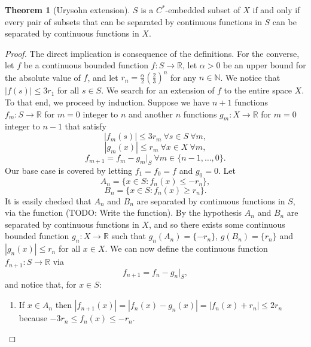 \documentclass[a4paper]{book}
\theoremstyle{definition}
\newtheorem{theorem}{Theorem}[section]
\theoremstyle{ejemplo}
\theoremstyle{demostracion}
\newcommand{\reales}{\mathbb{R}}
\newcommand{\naturales}{\mathbb{N}}
\begin{document}
\begin{theorem}[Urysohn extension]
	$S$ is a $C^*$-embedded subset of $X$ if and only if every pair of subsets that can be separated by continuous functions in $S$ can be separated by continuous functions in $X$.
\end{theorem}
\begin{proof}
	The direct implication is consequence of the definitions. For the converse, let $f$ be a continuous bounded function $f: S \rightarrow \reales$, let $\alpha > 0$ be an upper bound for the absolute value of $f$, and let $r_n = \frac{\alpha}{2} (\frac{2}{3})^n$ for any $n \in \naturales$. We notice that $|f(s)| \leq 3r_1$ for all $s \in S$. We search for an extension of $f$ to the entire space $X$. To that end, we proceed by induction. Suppose we have $n+1$ functions $f_m: S \rightarrow \reales$ for $m = 0$ integer to $n$ and another $n$ functions $g_m: X \rightarrow \reales$ for $m = 0$ integer to $n-1$ that satisfy
	\begin{equation*}
		|f_m(s)| \leq 3r_m\ \forall s \in S\ \forall m,
	\end{equation*}
	\begin{equation*}
		|g_m(x)| \leq r_m\ \forall x \in X\ \forall m,
	\end{equation*}
	\begin{equation*}
		f_{m+1} = f_m - g_m|_S\ \forall m \in \{ n-1, \ldots, 0\}.
	\end{equation*}
	Our base case is covered by letting $f_1 = f_0 = f$ and $g_0 = 0$. Let
	\begin{equation*}
		A_n = \{ x \in S : f_n(x) \leq -r_n\},
	\end{equation*}
	\begin{equation*}
		B_n = \{ x \in S : f_n(x) \geq r_n\}.
	\end{equation*}
	It is easily checked that $A_n$ and $B_n$ are separated by continuous functions in $S$, via the function (TODO: Write the function). By the hypothesis $A_n$ and $B_n$ are separated by continuous functions in $X$, and so there exists some continuous bounded function $g_n: X \rightarrow \reales$ such that $g_n(A_n) = \{ -r_n \}$, $g(B_n) = \{ r_n \}$ and $|g_n(x)| \leq r_n$ for all $x \in X$. We can now define the continuous function $f_{n+1}: S \rightarrow \reales$ via
	\begin{equation}\label{urysohn_ext_fdef}
		f_{n+1} = f_n - g_n|_{S},
	\end{equation}
	and notice that, for $x \in S$:
	\begin{enumerate}
		\item
		If $x \in A_n$ then $|f_{n+1}(x)| = |f_n(x) - g_n(x)| = |f_n(x) + r_n|\leq 2r_n$ because $-3r_n \leq f_n(x) \leq -r_n$.		
		

\end{enumerate}
\end{proof}
\end{document}

